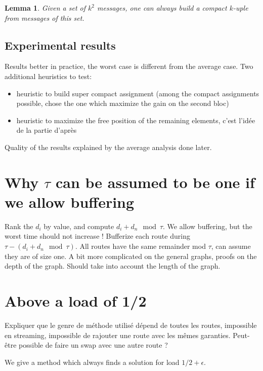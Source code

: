 \documentclass[10pt, conference, letterpaper]{IEEEtran}
\newtheorem{lemma}[theorem]{Lemma}
\begin{document}
\begin{lemma}
Given a set of $k^2$ messages, one can always build a compact $k$-uple
from messages of this set. 
\end{lemma}

\subsection{Experimental results}

Results better in practice, the worst case is different from the 
average case.
Two additional heuristics to test:
\begin{itemize}
	\item  heuristic to build super compact assignment (among the compact assignments
possible, chose the one which maximize the gain on the second bloc)
	\item heuristic to maximize the free position of the remaining elements, c'est l'idée
	de la partie d'après
\end{itemize}

Quality of the results explained by the average analysis done later.
 

\section{Why $\tau$ can be assumed to be one if we allow buffering}

Rank the $d_i$ by value, and compute $d_i + d_n \mod \tau$.
We allow buffering, but the worst time should not increase !
Bufferize  each route during $\tau - (d_i + d_n \mod \tau)$.
All routes have the same remainder mod $\tau$, can assume they are of 
size one.
A bit more complicated on the general graphs, proofs on the depth of the graph. 
Should take into account the length of the graph.


\section{Above a load of 1/2}


Expliquer que le genre de méthode utilisé dépend de toutes les routes,
impossible en streaming, impossible de rajouter une route avec les mêmes garanties.
Peut-être possible de faire un swap avec une autre route ?


We  give a method which always finds a solution for load $1/2 + \epsilon$.
\end{document}
